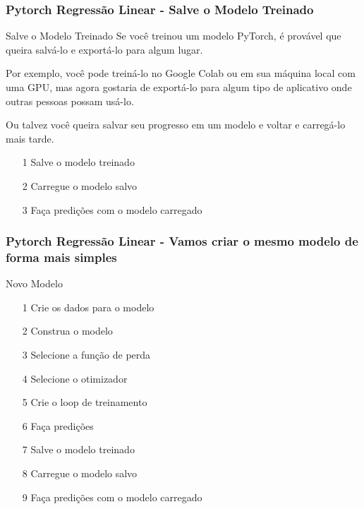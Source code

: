 \documentclass{beamer}
\begin{document}
\begin{frame}
	\frametitle{Pytorch Regressão Linear - Salve o Modelo Treinado}
	\begin{block}{Salve o Modelo Treinado}
		Se você treinou um modelo PyTorch, é provável que queira salvá-lo e exportá-lo para algum lugar.
		
		Por exemplo, você pode treiná-lo no Google Colab ou em sua máquina local com uma GPU, mas agora gostaria de exportá-lo para algum tipo de aplicativo onde outras pessoas possam usá-lo.
		
		Ou talvez você queira salvar seu progresso em um modelo e voltar e carregá-lo mais tarde.
		\begin{itemize}
			\item[1] Salve o modelo treinado
			\item[2] Carregue o modelo salvo
			\item[3] Faça predições com o modelo carregado
		\end{itemize}
		
	\end{block}
\end{frame}
\begin{frame}
	\frametitle{Pytorch Regressão Linear - Vamos criar o mesmo modelo de forma mais simples}
	\begin{block}{Novo Modelo}
		\begin{itemize}
			\item[1] Crie os dados para o modelo
			\item[2] Construa o modelo
			\item[3] Selecione a função de perda
			\item[4] Selecione o otimizador
			\item[5] Crie o loop de treinamento
			\item[6] Faça predições
			\item[7] Salve o modelo treinado
			\item[8] Carregue o modelo salvo
			\item[9] Faça predições com o modelo carregado
		\end{itemize}
		
	\end{block}
\end{frame}

\end{document}
